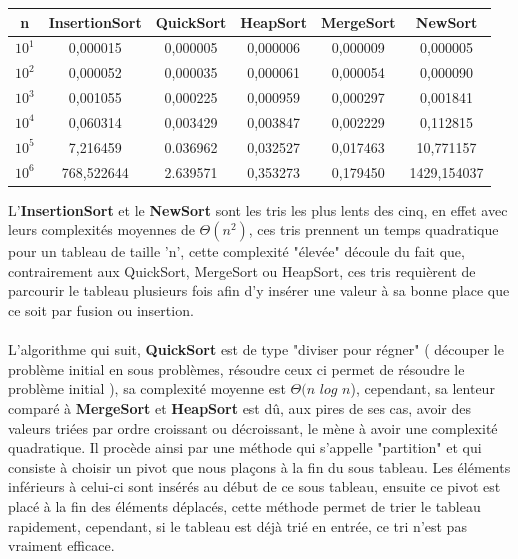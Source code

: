 \documentclass[a4paper, 11pt, oneside]{article}
\begin{document}
\begin{table}[htb]
\begin{tabular}{cccccc}
\hline

n   & InsertionSort & QuickSort & HeapSort & MergeSort & NewSort \\ \hline
$10^{1}$ & 0,000015      & 0,000005  & 0,000006         & 0,000009          & 0,000005        \\
$10^{2}$ & 0,000052      & 0,000035  & 0,000061         & 0,000054          & 0,000090        \\
$10^{3}$ & 0,001055      & 0,000225  & 0,000959         & 0,000297          & 0,001841        \\
$10^{4}$ & 0,060314      & 0,003429  & 0,003847         & 0,002229          & 0,112815        \\
$10^{5}$ & 7,216459      & 0.036962  & 0,032527         & 0,017463           & 10,771157        \\
$10^{6}$ & 768,522644    & 2.639571  & 0,353273         & 0,179450          & 1429,154037
        
\end{tabular}
\end{table}


L'\textbf{InsertionSort} et le \textbf{NewSort} sont les tris les plus lents des cinq, en effet avec leurs complexités moyennes de $\Theta(n^{2})$, ces tris prennent un temps quadratique pour un tableau de taille 'n', cette complexité "élevée" découle du fait que, contrairement aux QuickSort, MergeSort ou HeapSort, ces tris requièrent de parcourir le tableau plusieurs fois afin d'y insérer une valeur à sa bonne place que ce soit par fusion ou insertion. 
\\ \\
\indent L'algorithme qui suit, \textbf{QuickSort} est de type "diviser pour régner" ( découper le problème initial en sous problèmes, résoudre ceux ci permet de résoudre le problème initial ), sa complexité moyenne est $\Theta(n$ $log$ $n$), cependant, sa lenteur  comparé à \textbf{MergeSort} et \textbf{HeapSort} est dû, aux pires de ses cas, avoir des valeurs triées par ordre croissant ou décroissant, le mène à avoir une complexité quadratique. Il procède ainsi par une méthode qui s'appelle "partition" et qui consiste à choisir un pivot que nous plaçons à la fin du sous tableau. Les éléments inférieurs à celui-ci sont insérés au début de ce sous tableau, ensuite ce pivot est placé à la fin des éléments déplacés, cette méthode permet de trier le tableau rapidement, cependant, si le tableau est déjà trié en entrée, ce tri n'est pas vraiment efficace.\\ 
\end{document}
